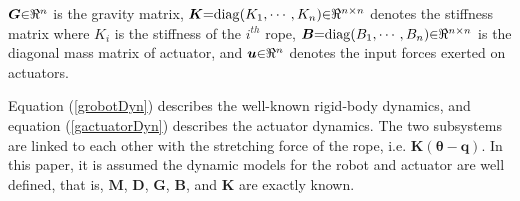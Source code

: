 \documentclass[letterpaper, 10 pt, conference]{ieeeconf}
\begin{document}
$\bm G\hspace{-0.1cm}\in\hspace{-0.1cm}\Re^n$ is the gravity matrix, $\bm
K\hspace{-0.1cm}=\hspace{-0.1cm}{\rm diag}(K_1, \cdots, K_n)\hspace{-0.1cm}\in\hspace{-0.1cm}\Re^{n\times n}$ denotes the
stiffness matrix where $K_i$ is the stiffness of the $i^{th}$ rope,
$\bm B
\hspace{-0.1cm}=\hspace{-0.1cm}{\rm diag}(B_1, \cdots, B_n)\hspace{-0.1cm}\in\hspace{-0.1cm}\Re^{n\times n}$ is the diagonal mass matrix of actuator, and $\bm
u\hspace{-0.1cm}\in\hspace{-0.1cm}\Re^n$ denotes the input forces
exerted on actuators.

Equation (\ref{grobotDyn}) describes the well-known rigid-body dynamics, and equation (\ref{gactuatorDyn}) describes the actuator dynamics. The two subsystems are linked to each other with the stretching force of the rope, i.e. $\bm K(\bm\theta-\bm q)$.
In this paper, it is assumed the dynamic models for the robot and actuator are well defined, that is, $\bm M$, $\bm D$, $\bm G$, $\bm B$, and $\bm K$ are exactly known.  %
\end{document}
